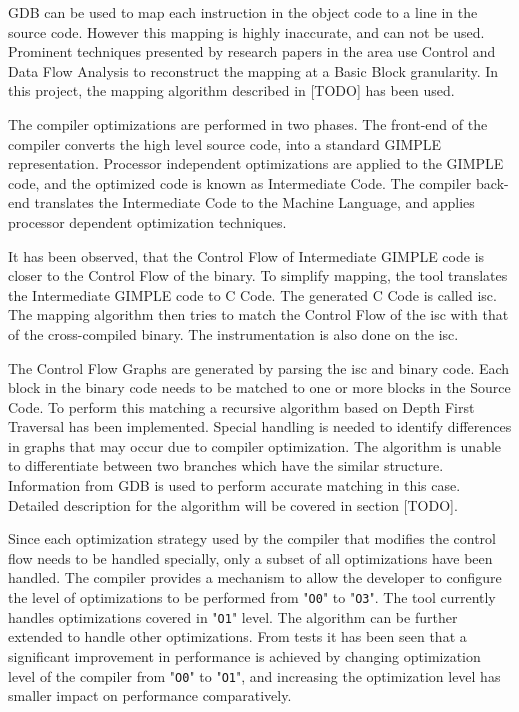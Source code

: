 GDB can be used to map each instruction in the object code to a line in the source code. However this mapping is highly inaccurate, and can not be used. Prominent techniques presented by research papers in the area use Control and Data Flow Analysis to reconstruct the mapping at a Basic Block granularity. In this project, the mapping algorithm described in [TODO] has been used.

The compiler optimizations are performed in two phases. The front-end of the compiler converts the high level source code, into a standard GIMPLE representation. Processor independent optimizations are applied to the GIMPLE code, and the optimized code is known as Intermediate Code. The compiler back-end translates the Intermediate Code to the Machine Language, and applies processor dependent optimization techniques.

It has been observed, that the Control Flow of Intermediate GIMPLE code is closer to the Control Flow of the binary. To simplify mapping, the tool translates the Intermediate GIMPLE code to C Code. The generated C Code is called \gls{isc}. The mapping algorithm then tries to match the Control Flow of the \gls{isc} with that of the cross-compiled binary. The instrumentation is also done on the \gls{isc}.

The Control Flow Graphs are generated by parsing the \gls{isc} and binary code. Each block in the binary code needs to be matched to one or more blocks in the Source Code. To perform this matching a recursive algorithm based on Depth First Traversal has been implemented. Special handling is needed to identify differences in graphs that may occur due to compiler optimization. The algorithm is unable to differentiate between two branches which have the similar structure. Information from GDB is used to perform accurate matching in this case. Detailed description for the algorithm will be covered in section [TODO].

Since each optimization strategy used by the compiler that modifies the control flow needs to be handled specially, only a subset of all optimizations have been handled. The compiler provides a mechanism to allow the developer to configure the level of optimizations to be performed from "\texttt{O0}" to "\texttt{O3}". The tool currently handles optimizations covered in "\texttt{O1}" level. The algorithm can be further extended to handle other optimizations. From tests it has been seen that a significant improvement in performance is achieved by changing optimization level of the compiler from "\texttt{O0}" to "\texttt{O1}", and increasing the optimization level has smaller impact on performance comparatively. 

